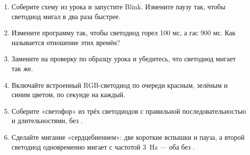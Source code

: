 \begin{tasks}
\begin{enumerate}
\item {} Соберите схему из урока и запустите Blink. Измените паузу так, чтобы светодиод мигал в два раза быстрее.
\item {} Измените программу так, чтобы светодиод горел 100 мс, а гас 900 мс. Как называется отношение этих времён?
\item {} Замените  на проверку  по образцу урока и убедитесь, что светодиод мигает так же.
\item {} Включайте встроенный RGB-светодиод по очереди красным, зелёным и синим цветом, по секунде на каждый.
\item {} Соберите «светофор» из трёх светодиодов с правильной последовательностью и длительностями, без .
\item {} Сделайте мигание «сердцебиением»: две короткие вспышки и пауза, а второй светодиод одновременно мигает с частотой \SI{3}{Hz} --- оба без .
\end{enumerate}
\end{tasks}
